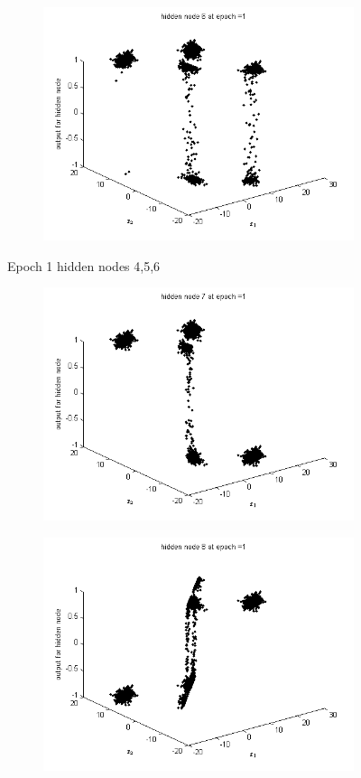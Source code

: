 \documentclass{article}
\begin{document}
\begin{flushleft}
\begin{figure}
\begin{subfigure}{.3\textwidth}
\end{subfigure}
\begin{subfigure}{.3\textwidth}
  \centering
  \includegraphics[width=.8\linewidth]{Classification/linearlySeparable/h1_6}
  
\end{subfigure}
\caption{Epoch 1 hidden nodes 4,5,6}
\end{figure}

\begin{figure}
\begin{subfigure}{.3\textwidth}
  \centering
  \includegraphics[width=.8\linewidth]{Classification/linearlySeparable/h1_7}
 
\end{subfigure}%
\begin{subfigure}{.3\textwidth}
  \centering
  \includegraphics[width=.8\linewidth]{Classification/linearlySeparable/h1_8}
  

\end{subfigure}
\end{figure}
\end{flushleft}
\end{document}
